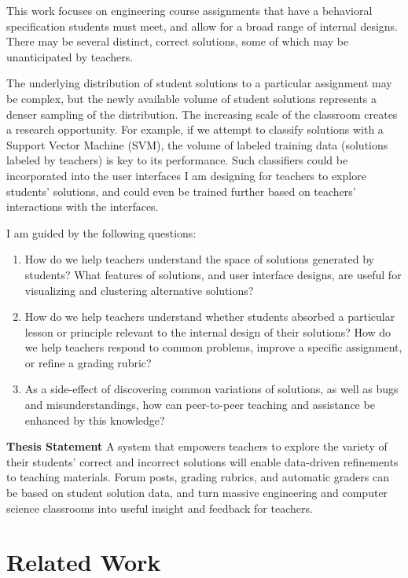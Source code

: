 \documentclass{sigchi}
\begin{document}
This work focuses on engineering course assignments that have a behavioral specification students must meet, and allow for a broad range of internal designs. There may be several distinct, correct solutions, some of which may be unanticipated by teachers. 

The underlying distribution of student solutions to a particular assignment may be complex, but the newly available volume of student solutions represents a denser sampling of the distribution. The increasing scale of the classroom creates a research opportunity. For example, if we attempt to classify solutions with a Support Vector Machine (SVM), the volume of labeled training data (solutions labeled by teachers) is key to its performance. Such classifiers could be incorporated into the user interfaces I am designing for teachers to explore students' solutions, and could even be trained further based on teachers' interactions with the interfaces. 

I am guided by the following questions:
\begin{enumerate}
\item How do we help teachers understand the space of solutions generated by students? What features of solutions, and user interface designs, are useful for visualizing and clustering alternative solutions?
\item How do we help teachers understand whether students absorbed a particular lesson or principle relevant to the internal design of their solutions? How do we help teachers respond to common problems, improve a specific assignment, or refine a grading rubric?
\item As a side-effect of discovering common variations of solutions, as well as bugs and misunderstandings, how can peer-to-peer teaching and assistance be enhanced by this knowledge?
\end{enumerate}

{\bf Thesis Statement} A system that empowers teachers to explore the variety of their students' correct and incorrect solutions will enable data-driven refinements to teaching materials. Forum posts, grading rubrics, and automatic graders can be based on student solution data, and turn massive engineering and computer science classrooms into useful insight and feedback for teachers. 

\section{Related Work}
\end{document}
